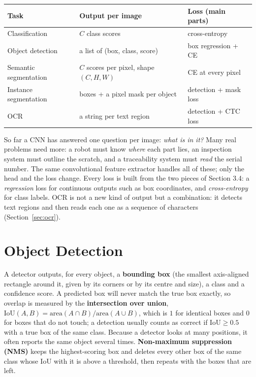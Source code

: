 \documentclass[12pt, a4paper]{article}
\begin{document}
\begin{center}
  \renewcommand{\arraystretch}{1.35}
  \begin{tabular}{lll}
    \toprule
    Task                  & Output per image                        & Loss (main parts)     \\
    \midrule
    Classification        & $C$ class scores                        & cross-entropy         \\
    Object detection      & a list of (box, class, score)           & box regression + CE   \\
    Semantic segmentation & $C$ scores per pixel, shape $(C, H, W)$ & CE at every pixel     \\
    Instance segmentation & boxes + a pixel mask per object         & detection + mask loss \\
    OCR                   & a string per text region                & detection + CTC loss  \\
    \bottomrule
  \end{tabular}
\end{center}

So far a CNN has answered one question per image: \emph{what is in it?} Many
real problems need more: a robot must know \emph{where} each part lies, an
inspection system must outline the scratch, and a traceability system must
\emph{read} the serial number. The same convolutional feature extractor
handles all of these; only the head and the loss change. Every loss is built
from the two pieces of Section 3.4: a \emph{regression} loss for continuous
outputs such as box coordinates, and \emph{cross-entropy} for class labels.
OCR is not a new kind of output but a combination: it detects text regions
and then reads each one as a sequence of characters
(Section~\ref{sec:ocr}).

\section{Object Detection}

A detector outputs, for every object, a \textbf{bounding box} (the smallest
axis-aligned rectangle around it, given by its corners or by its centre and
size), a class and a confidence score. A predicted box will never match the
true box exactly, so overlap is measured by the \textbf{intersection over
  union}, $\text{IoU}(A, B) = \text{area}(A \cap B) / \text{area}(A \cup B)$,
which is $1$ for identical boxes and $0$ for boxes that do not touch; a
detection usually counts as correct if $\text{IoU} \ge 0.5$ with a true box of
the same class. Because a detector looks at many positions, it often reports
the same object several times. \textbf{Non-maximum suppression (NMS)} keeps
the highest-scoring box and deletes every other box of the same class whose
IoU with it is above a threshold, then repeats with the boxes that are left.
\end{document}
